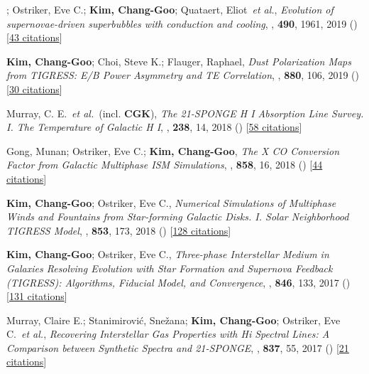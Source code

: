 \item[{18.}]; Ostriker, Eve C.; \textbf{Kim, Chang-Goo}; Quataert, Eliot~\textit{et al.}, \textit{Evolution of supernovae-driven superbubbles with conduction and cooling}, , \textbf{490}, 1961, 2019 () [\href{http://adsabs.harvard.edu/abs/2019MNRAS.490.1961E}{43 citations}]

\item[{17.}]\textbf{Kim, Chang-Goo}; Choi, Steve K.; Flauger, Raphael, \textit{Dust Polarization Maps from TIGRESS: E/B Power Asymmetry and TE Correlation}, , \textbf{880}, 106, 2019 () [\href{http://adsabs.harvard.edu/abs/2019ApJ...880..106K}{30 citations}]

\item[{16.}]Murray, C. E.~\textit{et al.}~(incl. \textbf{CGK}), \textit{The 21-SPONGE H I Absorption Line Survey. I. The Temperature of Galactic H I}, , \textbf{238}, 14, 2018 () [\href{http://adsabs.harvard.edu/abs/2018ApJS..238...14M}{58 citations}]

\item[{15.}]Gong, Munan; Ostriker, Eve C.; \textbf{Kim, Chang-Goo}, \textit{The X CO Conversion Factor from Galactic Multiphase ISM Simulations}, , \textbf{858}, 16, 2018 () [\href{http://adsabs.harvard.edu/abs/2018ApJ...858...16G}{44 citations}]

\item[{14.}]\textbf{Kim, Chang-Goo}; Ostriker, Eve C., \textit{Numerical Simulations of Multiphase Winds and Fountains from Star-forming Galactic Disks. I. Solar Neighborhood TIGRESS Model}, , \textbf{853}, 173, 2018 () [\href{http://adsabs.harvard.edu/abs/2018ApJ...853..173K}{128 citations}]

\item[{13.}]\textbf{Kim, Chang-Goo}; Ostriker, Eve C., \textit{Three-phase Interstellar Medium in Galaxies Resolving Evolution with Star Formation and Supernova Feedback (TIGRESS): Algorithms, Fiducial Model, and Convergence}, , \textbf{846}, 133, 2017 () [\href{http://adsabs.harvard.edu/abs/2017ApJ...846..133K}{131 citations}]

\item[{12.}]Murray, Claire E.; Stanimirovi{\'c}, Sne{\v{z}}ana; \textbf{Kim, Chang-Goo}; Ostriker, Eve C.~\textit{et al.}, \textit{Recovering Interstellar Gas Properties with Hi Spectral Lines: A Comparison between Synthetic Spectra and 21-SPONGE}, , \textbf{837}, 55, 2017 () [\href{http://adsabs.harvard.edu/abs/2017ApJ...837...55M}{21 citations}]

